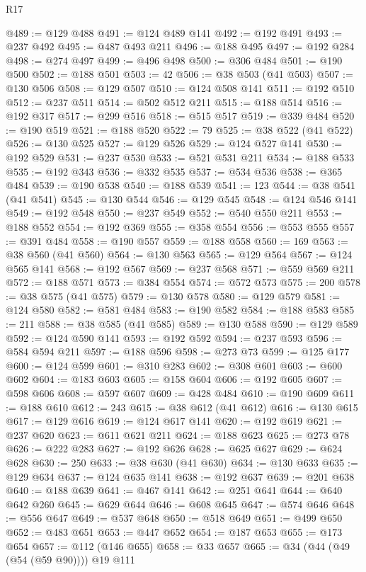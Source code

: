 \begin{lexlean}{R17}
\begin{coremodule}
@489 := @129 @488
@491 := @124 @489 @141
@492 := @192 @491
@493 := @237 @492
@495 := @487 @493 @211
@496 := @188 @495
@497 := @192 @284
@498 := @274 @497
@499 := @496 @498
@500 := @306 @484
@501 := @190 @500
@502 := @188 @501
@503 := 42
@506 := @38 @503 (@41 @503)
@507 := @130 @506
@508 := @129 @507
@510 := @124 @508 @141
@511 := @192 @510
@512 := @237 @511
@514 := @502 @512 @211
@515 := @188 @514
@516 := @192 @317
@517 := @299 @516
@518 := @515 @517
@519 := @339 @484
@520 := @190 @519
@521 := @188 @520
@522 := 79
@525 := @38 @522 (@41 @522)
@526 := @130 @525
@527 := @129 @526
@529 := @124 @527 @141
@530 := @192 @529
@531 := @237 @530
@533 := @521 @531 @211
@534 := @188 @533
@535 := @192 @343
@536 := @332 @535
@537 := @534 @536
@538 := @365 @484
@539 := @190 @538
@540 := @188 @539
@541 := 123
@544 := @38 @541 (@41 @541)
@545 := @130 @544
@546 := @129 @545
@548 := @124 @546 @141
@549 := @192 @548
@550 := @237 @549
@552 := @540 @550 @211
@553 := @188 @552
@554 := @192 @369
@555 := @358 @554
@556 := @553 @555
@557 := @391 @484
@558 := @190 @557
@559 := @188 @558
@560 := 169
@563 := @38 @560 (@41 @560)
@564 := @130 @563
@565 := @129 @564
@567 := @124 @565 @141
@568 := @192 @567
@569 := @237 @568
@571 := @559 @569 @211
@572 := @188 @571
@573 := @384 @554
@574 := @572 @573
@575 := 200
@578 := @38 @575 (@41 @575)
@579 := @130 @578
@580 := @129 @579
@581 := @124 @580
@582 := @581 @484
@583 := @190 @582
@584 := @188 @583
@585 := 211
@588 := @38 @585 (@41 @585)
@589 := @130 @588
@590 := @129 @589
@592 := @124 @590 @141
@593 := @192 @592
@594 := @237 @593
@596 := @584 @594 @211
@597 := @188 @596
@598 := @273 @73
@599 := @125 @177
@600 := @124 @599
@601 := @310 @283
@602 := @308 @601
@603 := @600 @602
@604 := @183 @603
@605 := @158 @604
@606 := @192 @605
@607 := @598 @606
@608 := @597 @607
@609 := @428 @484
@610 := @190 @609
@611 := @188 @610
@612 := 243
@615 := @38 @612 (@41 @612)
@616 := @130 @615
@617 := @129 @616
@619 := @124 @617 @141
@620 := @192 @619
@621 := @237 @620
@623 := @611 @621 @211
@624 := @188 @623
@625 := @273 @78
@626 := @222 @283
@627 := @192 @626
@628 := @625 @627
@629 := @624 @628
@630 := 250
@633 := @38 @630 (@41 @630)
@634 := @130 @633
@635 := @129 @634
@637 := @124 @635 @141
@638 := @192 @637
@639 := @201 @638
@640 := @188 @639
@641 := @467 @141
@642 := @251 @641
@644 := @640 @642 @260
@645 := @629 @644
@646 := @608 @645
@647 := @574 @646
@648 := @556 @647
@649 := @537 @648
@650 := @518 @649
@651 := @499 @650
@652 := @483 @651
@653 := @447 @652
@654 := @187 @653
@655 := @173 @654
@657 := @112 (@146 @655)
@658 := @33 @657
@665 := @34 (@44 (@49 (@54 (@59 @90)))) @19 @111

\end{coremodule}
\end{lexlean}
